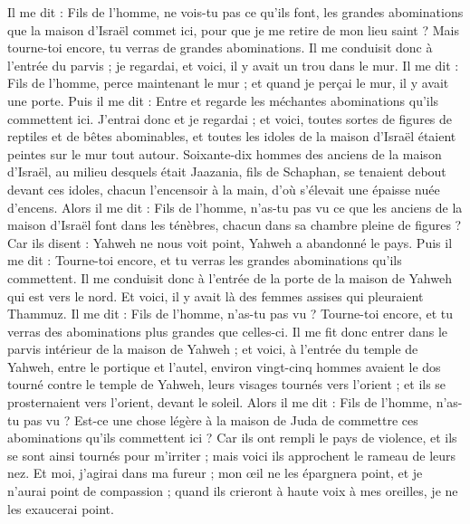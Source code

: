 \begin{multicols}{2}
Il me dit : Fils de l'homme, ne vois-tu pas ce qu'ils font, les grandes abominations que la maison d'Israël commet ici, pour que je me retire de mon lieu saint ? Mais tourne-toi encore, tu verras de grandes abominations.
Il me conduisit donc à l'entrée du parvis ; je regardai, et voici, il y avait un trou dans le mur.
Il me dit : Fils de l'homme, perce maintenant le mur ; et quand je perçai le mur, il y avait une porte.
Puis il me dit : Entre et regarde les méchantes abominations qu'ils commettent ici.
J'entrai donc et je regardai ; et voici, toutes sortes de figures de reptiles et de bêtes abominables, et toutes les idoles de la maison d'Israël étaient peintes sur le mur tout autour.
Soixante-dix hommes des anciens de la maison d'Israël, au milieu desquels était Jaazania, fils de Schaphan, se tenaient debout devant ces idoles, chacun l'encensoir à la main, d'où s'élevait une épaisse nuée d'encens.
Alors il me dit : Fils de l'homme, n'as-tu pas vu ce que les anciens de la maison d'Israël font dans les ténèbres, chacun dans sa chambre pleine de figures ? Car ils disent : Yahweh ne nous voit point, Yahweh a abandonné le pays.
Puis il me dit : Tourne-toi encore, et tu verras les grandes abominations qu'ils commettent.
Il me conduisit donc à l'entrée de la porte de la maison de Yahweh qui est vers le nord. Et voici, il y avait là des femmes assises qui pleuraient Thammuz.
Il me dit : Fils de l'homme, n'as-tu pas vu ? Tourne-toi encore, et tu verras des abominations plus grandes que celles-ci.
Il me fit donc entrer dans le parvis intérieur de la maison de Yahweh ; et voici, à l'entrée du temple de Yahweh, entre le portique et l'autel, environ vingt-cinq hommes avaient le dos tourné contre le temple de Yahweh, leurs visages tournés vers l'orient ; et ils se prosternaient vers l'orient, devant le soleil.
Alors il me dit : Fils de l'homme, n'as-tu pas vu ? Est-ce une chose légère à la maison de Juda de commettre ces abominations qu'ils commettent ici ? Car ils ont rempli le pays de violence, et ils se sont ainsi tournés pour m'irriter ; mais voici ils approchent le rameau de leurs nez.
Et moi, j'agirai dans ma fureur ; mon œil ne les épargnera point, et je n'aurai point de compassion ; quand ils crieront à haute voix à mes oreilles, je ne les exaucerai point.

\end{multicols}
